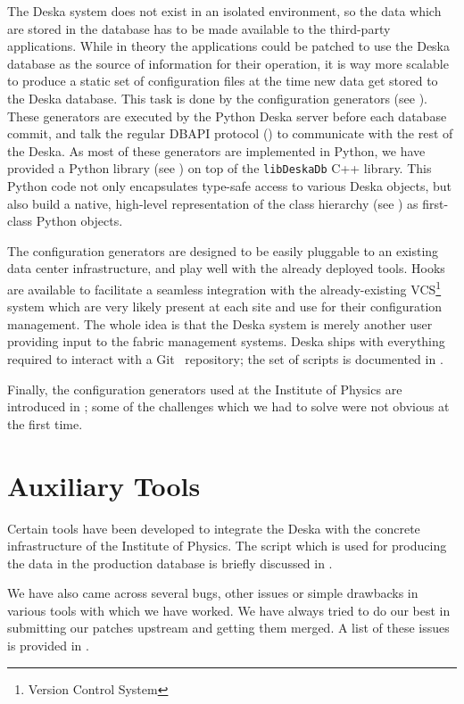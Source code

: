 \documentclass[deska]{subfiles}
\begin{document}
The Deska system does not exist in an isolated environment, so the data which are stored in the database has to be made
available to the third-party applications.  While in theory the applications could be patched to use the Deska database
as the source of information for their operation, it is way more scalable to produce a static set of configuration files
at the time new data get stored to the Deska database.  This task is done by the configuration generators (see
).  These generators are executed by the Python Deska server before each database commit,
and talk the regular DBAPI protocol () to communicate with the rest of the Deska.  As most of
these generators are implemented in Python, we have provided a Python library (see ) on top
of the {\tt libDeskaDb} C++ library.  This Python code not only encapsulates type-safe access to
various Deska objects, but also build a native, high-level representation of the class hierarchy (see
) as first-class Python objects.

The configuration generators are designed to be easily pluggable to an existing data center infrastructure, and play
well with the already deployed tools.  Hooks are available to facilitate a seamless integration with the
already-existing VCS\footnote{Version Control System} system which are very likely present at each site and use for
their configuration management.  The whole idea is that the Deska system is merely another user providing input to the
fabric management systems.  Deska ships with everything required to interact with a Git~\cite{git} repository; the set
of scripts is documented in .

Finally, the configuration generators used at the Institute of Physics are introduced in ; some
of the challenges which we had to solve were not obvious at the first time.

\section{Auxiliary Tools}

Certain tools have been developed to integrate the Deska with the concrete infrastructure of the Institute of Physics.
The script which is used for producing the data in the production database is briefly discussed in
.

We have also came across several bugs, other issues or simple drawbacks in various tools with which we have worked.  We
have always tried to do our best in submitting our patches upstream and getting them merged.  A list of these issues is
provided in .
\end{document}

